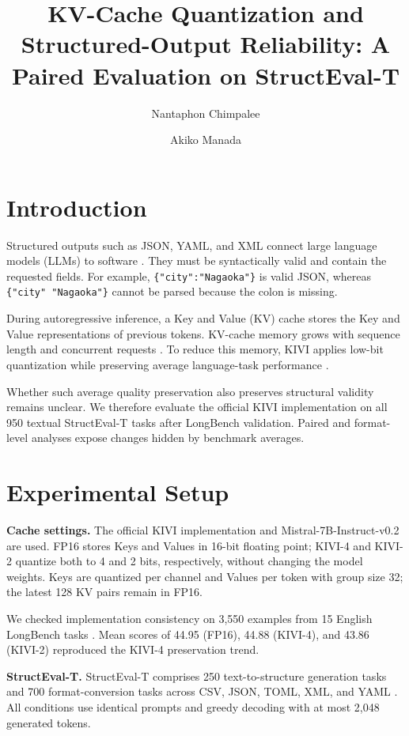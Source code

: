 \documentclass[twocolumn,a4paper]{ieicejsp}
\title{{\bf KV-Cache Quantization and Structured-Output Reliability: A Paired Evaluation on StructEval-T}}
\author{
  Nantaphon Chimpalee \and
  Akiko Manada
}
\begin{document}
\maketitle
\balance
\renewcommand{\tablename}{Table}
\renewcommand{\refname}{References}
\setlength{\intextsep}{3pt}
\setlength{\textfloatsep}{4pt}
\setlength{\floatsep}{4pt}
\setlength{\abovecaptionskip}{2pt}
\setlength{\belowcaptionskip}{1pt}

\section{Introduction}
Structured outputs such as JSON, YAML, and XML connect large language models
(LLMs) to software \cite{structeval2026}.  They must be syntactically valid and
contain the requested fields.  For example,
\verb|{"city":"Nagaoka"}| is valid JSON, whereas \verb|{"city" "Nagaoka"}|
cannot be parsed because the colon is missing.

During autoregressive inference, a Key and Value (KV) cache stores the Key and
Value representations of previous tokens.  KV-cache memory grows with sequence
length and concurrent requests \cite{kwon2023pagedattention}.  To reduce this
memory, KIVI applies low-bit quantization while preserving average
language-task performance \cite{liu2024kivi}.

Whether such average quality preservation also preserves structural validity
remains unclear.  We therefore evaluate the official KIVI implementation on
all 950 textual StructEval-T tasks after LongBench validation.  Paired and
format-level analyses expose changes hidden by benchmark averages.

\section{Experimental Setup}
\noindent\textbf{Cache settings.} The official KIVI implementation and
Mistral-7B-Instruct-v0.2 are used.  FP16 stores Keys and Values in 16-bit
floating point; KIVI-4 and KIVI-2 quantize both to 4 and 2 bits, respectively,
without changing the model weights.  Keys are quantized per channel and Values
per token with group size 32; the latest 128 KV pairs remain in FP16.

We checked implementation consistency on 3,550 examples from 15 English
LongBench tasks \cite{bai2024longbench}.  Mean scores of 44.95 (FP16), 44.88
(KIVI-4), and 43.86 (KIVI-2) reproduced the KIVI-4 preservation trend.

\noindent\textbf{StructEval-T.}
StructEval-T comprises 250 text-to-structure generation tasks and 700
format-conversion tasks across CSV, JSON, TOML, XML, and YAML
\cite{structeval2026}.  All conditions use identical prompts and greedy
decoding with at most 2,048 generated tokens.
\end{document}
